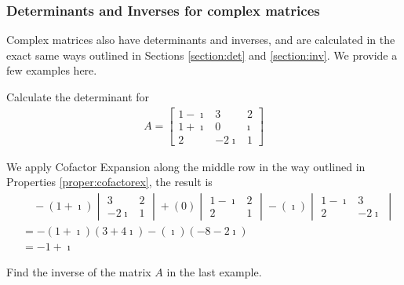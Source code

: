 \subsubsection{Determinants and Inverses for complex matrices}
Complex matrices also have determinants and inverses, and are calculated in the exact same ways outlined in Sections \ref{section:det} and \ref{section:inv}. We provide a few examples here.

\begin{exmp}
Calculate the determinant for
\begin{align*}
A = 
\begin{bmatrix}
1-\imath & 3 & 2 \\
1+\imath & 0 & \imath \\
2 & -2\imath & 1
\end{bmatrix}
\end{align*}
\end{exmp}
\begin{solution}
We apply Cofactor Expansion along the middle row in the way outlined in Properties \ref{proper:cofactorex}, the result is
\begin{align*}
&\quad -(1+\imath)
\begin{vmatrix}
3 & 2 \\
-2\imath & 1
\end{vmatrix}
+ (0)
\begin{vmatrix}
1-\imath & 2 \\
2 & 1
\end{vmatrix}
- (\imath)
\begin{vmatrix}
1-\imath & 3 \\
2 & -2\imath
\end{vmatrix} \\
&= -(1+\imath)(3+4\imath) - (\imath)(-8-2\imath) \\
&= -1 + \imath
\end{align*}  
\end{solution}

\begin{exmp}
Find the inverse of the matrix $A$ in the last example.
\end{exmp}

